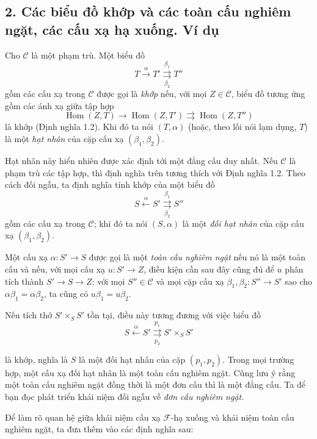 \subsection*{2. Các biểu đồ khớp và các toàn cấu nghiêm ngặt, các cấu xạ
hạ xuống. Ví dụ}

 Cho $\mathcal C$ là một phạm trù. Một biểu đồ
\[
  T\xrightarrow{\alpha}T'
  \overset{\beta_1}{\underset{\beta_2}{\rightrightarrows}}T''
\]
gồm các cấu xạ trong $\mathcal C$ được gọi là \emph{khớp} nếu, với mọi
$Z\in\mathcal C$, biểu đồ tương ứng gồm các ánh xạ giữa tập hợp
\[
  \operatorname{Hom}(Z,T)\longrightarrow
  \operatorname{Hom}(Z,T')
  \rightrightarrows\operatorname{Hom}(Z,T'')
\]
là khớp (Định nghĩa 1.2). Khi đó ta nói $(T,\alpha)$ (hoặc, theo lối nói lạm
dụng, $T$) là một \emph{hạt nhân} của cặp cấu xạ
$(\beta_1,\beta_2)$.

Hạt nhân này hiển nhiên được xác định tới một đẳng cấu duy nhất. Nếu
$\mathcal C$ là phạm trù các tập hợp, thì định nghĩa trên tương thích với Định
nghĩa 1.2. Theo cách đối ngẫu, ta định nghĩa tính khớp của một biểu đồ
\[
  S\xleftarrow{\alpha}S'
  \overset{\beta_1}{\underset{\beta_2}{\rightrightarrows}}S''
\]
gồm các cấu xạ trong $\mathcal C$; khi đó ta nói $(S,\alpha)$ là một
\emph{đối hạt nhân} của cặp cấu xạ $(\beta_1,\beta_2)$.

 Một cấu xạ $\alpha:S'\longrightarrow S$ được gọi là
một \emph{toàn cấu nghiêm ngặt} nếu nó là một toàn cấu và nếu, với mọi cấu xạ
$u:S'\longrightarrow Z$, điều kiện cần sau đây cũng đủ để $u$ phân tích thành
$S'\longrightarrow S\longrightarrow Z$: với mọi $S''\in\mathcal C$ và mọi
cặp cấu xạ $\beta_1,\beta_2:S''\longrightarrow S'$ sao cho
$\alpha\beta_1=\alpha\beta_2$, ta cũng có $u\beta_1=u\beta_2$.

Nếu tích thớ $S'\times_S S'$ tồn tại, điều này tương đương với việc biểu đồ
\[
  S\xleftarrow{\alpha}S'
  \overset{p_1}{\underset{p_2}{\rightrightarrows}}S'\times_S S'
\]

là khớp, nghĩa là $S$ là một đối hạt nhân của cặp $(p_1,p_2)$. Trong mọi
trường hợp, một cấu xạ đối hạt nhân là một toàn cấu nghiêm ngặt. Cũng lưu ý
rằng một toàn cấu nghiêm ngặt đồng thời là một đơn cấu thì là một đẳng cấu.
Ta để bạn đọc phát triển khái niệm đối ngẫu về \emph{đơn cấu nghiêm ngặt}.

Để làm rõ quan hệ giữa khái niệm cấu xạ $\mathcal F$-hạ xuống và khái niệm
toàn cấu nghiêm ngặt, ta đưa thêm vào các định nghĩa sau:


